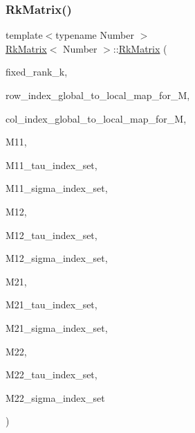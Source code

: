 \mbox{\label{classRkMatrix_a08f64aa2d91226f2d4e4f84911be5079}} 
\subsubsection{\texorpdfstring{Rk\+Matrix()}{RkMatrix()}\hspace{0.1cm}{\footnotesize\ttfamily [17/18]}}
{\footnotesize\ttfamily template$<$typename Number $>$ \\
\hyperlink{classRkMatrix}{Rk\+Matrix}$<$ Number $>$\+::\hyperlink{classRkMatrix}{Rk\+Matrix} (\begin{DoxyParamCaption}\item[{const \hyperlink{classRkMatrix_add060bfc3a4cc77f858c3d6dd58cadd5}{size\+\_\+type}}]{fixed\+\_\+rank\+\_\+k,  }\item[{const std\+::map$<$ types\+::global\+\_\+dof\+\_\+index, size\+\_\+t $>$ \&}]{row\+\_\+index\+\_\+global\+\_\+to\+\_\+local\+\_\+map\+\_\+for\+\_\+M,  }\item[{const std\+::map$<$ types\+::global\+\_\+dof\+\_\+index, size\+\_\+t $>$ \&}]{col\+\_\+index\+\_\+global\+\_\+to\+\_\+local\+\_\+map\+\_\+for\+\_\+M,  }\item[{const \hyperlink{classRkMatrix}{Rk\+Matrix}$<$ Number $>$ \&}]{M11,  }\item[{const std\+::vector$<$ types\+::global\+\_\+dof\+\_\+index $>$ \&}]{M11\+\_\+tau\+\_\+index\+\_\+set,  }\item[{const std\+::vector$<$ types\+::global\+\_\+dof\+\_\+index $>$ \&}]{M11\+\_\+sigma\+\_\+index\+\_\+set,  }\item[{const \hyperlink{classRkMatrix}{Rk\+Matrix}$<$ Number $>$ \&}]{M12,  }\item[{const std\+::vector$<$ types\+::global\+\_\+dof\+\_\+index $>$ \&}]{M12\+\_\+tau\+\_\+index\+\_\+set,  }\item[{const std\+::vector$<$ types\+::global\+\_\+dof\+\_\+index $>$ \&}]{M12\+\_\+sigma\+\_\+index\+\_\+set,  }\item[{const \hyperlink{classRkMatrix}{Rk\+Matrix}$<$ Number $>$ \&}]{M21,  }\item[{const std\+::vector$<$ types\+::global\+\_\+dof\+\_\+index $>$ \&}]{M21\+\_\+tau\+\_\+index\+\_\+set,  }\item[{const std\+::vector$<$ types\+::global\+\_\+dof\+\_\+index $>$ \&}]{M21\+\_\+sigma\+\_\+index\+\_\+set,  }\item[{const \hyperlink{classRkMatrix}{Rk\+Matrix}$<$ Number $>$ \&}]{M22,  }\item[{const std\+::vector$<$ types\+::global\+\_\+dof\+\_\+index $>$ \&}]{M22\+\_\+tau\+\_\+index\+\_\+set,  }\item[{const std\+::vector$<$ types\+::global\+\_\+dof\+\_\+index $>$ \&}]{M22\+\_\+sigma\+\_\+index\+\_\+set }\end{DoxyParamCaption})}

